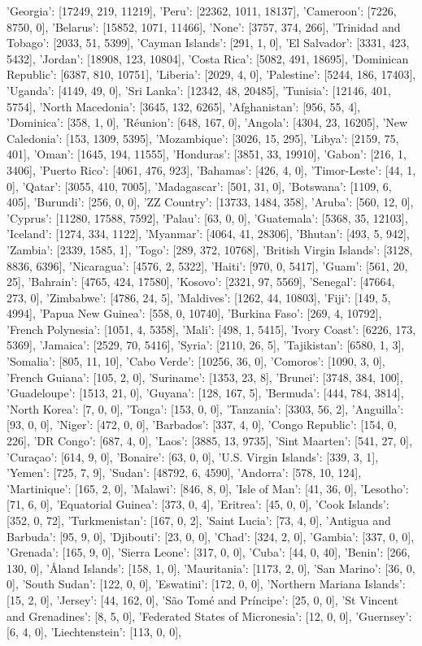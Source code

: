 'Georgia': [17249, 219, 11219], 'Peru': [22362, 1011, 18137], 'Cameroon': [7226, 8750, 0], 'Belarus': [15852, 1071, 11466], 'None': [3757, 374, 266], 'Trinidad and Tobago': [2033, 51, 5399], 'Cayman Islands': [291, 1, 0], 'El Salvador': [3331, 423, 5432], 'Jordan': [18908, 123, 10804], 'Costa Rica': [5082, 491, 18695], 'Dominican Republic': [6387, 810, 10751], 'Liberia': [2029, 4, 0], 'Palestine': [5244, 186, 17403], 'Uganda': [4149, 49, 0], 'Sri Lanka': [12342, 48, 20485], 'Tunisia': [12146, 401, 5754], 'North Macedonia': [3645, 132, 6265], 'Afghanistan': [956, 55, 4], 'Dominica': [358, 1, 0], 'Réunion': [648, 167, 0], 'Angola': [4304, 23, 16205], 'New Caledonia': [153, 1309, 5395], 'Mozambique': [3026, 15, 295], 'Libya': [2159, 75, 401], 'Oman': [1645, 194, 11555], 'Honduras': [3851, 33, 19910], 'Gabon': [216, 1, 3406], 'Puerto Rico': [4061, 476, 923], 'Bahamas': [426, 4, 0], 'Timor-Leste': [44, 1, 0], 'Qatar': [3055, 410, 7005], 'Madagascar': [501, 31, 0], 'Botswana': [1109, 6, 405], 'Burundi': [256, 0, 0], 'ZZ Country': [13733, 1484, 358], 'Aruba': [560, 12, 0], 'Cyprus': [11280, 17588, 7592], 'Palau': [63, 0, 0], 'Guatemala': [5368, 35, 12103], 'Iceland': [1274, 334, 1122], 'Myanmar': [4064, 41, 28306], 'Bhutan': [493, 5, 942], 'Zambia': [2339, 1585, 1], 'Togo': [289, 372, 10768], 'British Virgin Islands': [3128, 8836, 6396], 'Nicaragua': [4576, 2, 5322], 'Haiti': [970, 0, 5417], 'Guam': [561, 20, 25], 'Bahrain': [4765, 424, 17580], 'Kosovo': [2321, 97, 5569], 'Senegal': [47664, 273, 0], 'Zimbabwe': [4786, 24, 5], 'Maldives': [1262, 44, 10803], 'Fiji': [149, 5, 4994], 'Papua New Guinea': [558, 0, 10740], 'Burkina Faso': [269, 4, 10792], 'French Polynesia': [1051, 4, 5358], 'Mali': [498, 1, 5415], 'Ivory Coast': [6226, 173, 5369], 'Jamaica': [2529, 70, 5416], 'Syria': [2110, 26, 5], 'Tajikistan': [6580, 1, 3], 'Somalia': [805, 11, 10], 'Cabo Verde': [10256, 36, 0], 'Comoros': [1090, 3, 0], 'French Guiana': [105, 2, 0], 'Suriname': [1353, 23, 8], 'Brunei': [3748, 384, 100], 'Guadeloupe': [1513, 21, 0], 'Guyana': [128, 167, 5], 'Bermuda': [444, 784, 3814], 'North Korea': [7, 0, 0], 'Tonga': [153, 0, 0], 'Tanzania': [3303, 56, 2], 'Anguilla': [93, 0, 0], 'Niger': [472, 0, 0], 'Barbados': [337, 4, 0], 'Congo Republic': [154, 0, 226], 'DR Congo': [687, 4, 0], 'Laos': [3885, 13, 9735], 'Sint Maarten': [541, 27, 0], 'Curaçao': [614, 9, 0], 'Bonaire': [63, 0, 0], 'U.S. Virgin Islands': [339, 3, 1], 'Yemen': [725, 7, 9], 'Sudan': [48792, 6, 4590], 'Andorra': [578, 10, 124], 'Martinique': [165, 2, 0], 'Malawi': [846, 8, 0], 'Isle of Man': [41, 36, 0], 'Lesotho': [71, 6, 0], 'Equatorial Guinea': [373, 0, 4], 'Eritrea': [45, 0, 0], 'Cook Islands': [352, 0, 72], 'Turkmenistan': [167, 0, 2], 'Saint Lucia': [73, 4, 0], 'Antigua and Barbuda': [95, 9, 0], 'Djibouti': [23, 0, 0], 'Chad': [324, 2, 0], 'Gambia': [337, 0, 0], 'Grenada': [165, 9, 0], 'Sierra Leone': [317, 0, 0], 'Cuba': [44, 0, 40], 'Benin': [266, 130, 0], 'Åland Islands': [158, 1, 0], 'Mauritania': [1173, 2, 0], 'San Marino': [36, 0, 0], 'South Sudan': [122, 0, 0], 'Eswatini': [172, 0, 0], 'Northern Mariana Islands': [15, 2, 0], 'Jersey': [44, 162, 0], 'São Tomé and Príncipe': [25, 0, 0], 'St Vincent and Grenadines': [8, 5, 0], 'Federated States of Micronesia': [12, 0, 0], 'Guernsey': [6, 4, 0], 'Liechtenstein': [113, 0, 0], 